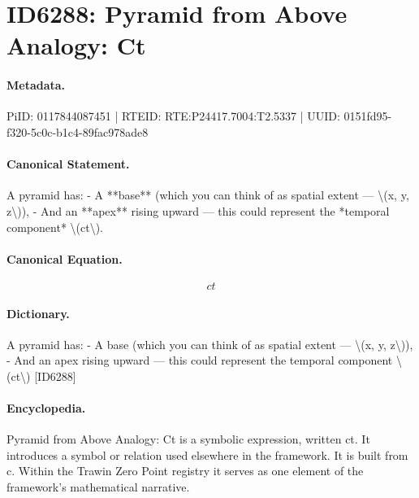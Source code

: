 \section*{ID6288: Pyramid from Above Analogy: Ct}
\paragraph{Metadata.}
PiID: 0117844087451 | RTEID: RTE:P24417.7004:T2.5337 | UUID: 0151fd95-f320-5c0c-b1c4-89fac978ade8

\paragraph{Canonical Statement.}
A pyramid has: - A **base** (which you can think of as spatial extent — \textbackslash{}(x, y, z\textbackslash{})), - And an **apex** rising upward — this could represent the *temporal component* \textbackslash{}(ct\textbackslash{}).

\paragraph{Canonical Equation.}
\[
ct
\]

\paragraph{Dictionary.}
A pyramid has: - A base (which you can think of as spatial extent — \textbackslash{}(x, y, z\textbackslash{})), - And an apex rising upward — this could represent the temporal component \textbackslash{}(ct\textbackslash{}) [ID6288]

\paragraph{Encyclopedia.}
Pyramid from Above Analogy: Ct is a symbolic expression, written ct. It introduces a symbol or relation used elsewhere in the framework. It is built from c. Within the Trawin Zero Point registry it serves as one element of the framework's mathematical narrative.
